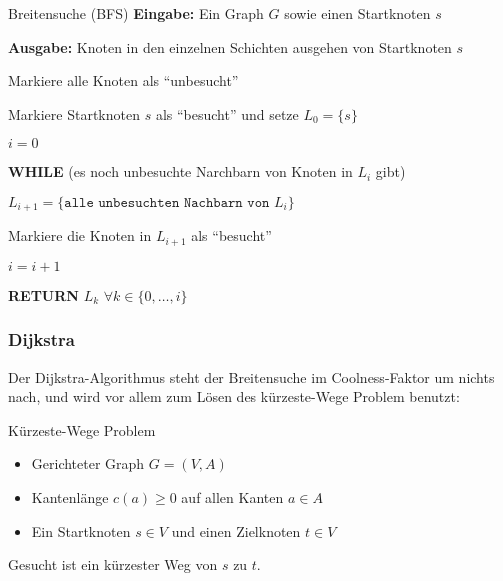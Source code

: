 \documentclass{panikzettel}
\newcommand\tab[1][1cm]{\hspace*{#1}}
\begin{document}
\begin{algo}{Breitensuche (BFS)}
	\textbf{Eingabe:} Ein Graph $G$ sowie einen Startknoten $s$
	
	\textbf{Ausgabe:} Knoten in den einzelnen Schichten ausgehen von Startknoten $s$
	
	\tcblower
	
	Markiere alle Knoten als ``unbesucht''
	
	Markiere Startknoten $s$ als ``besucht'' und setze $L_0 = \{s\}$
	
	$i=0$
	
	\textbf{WHILE} (es noch unbesuchte Narchbarn von Knoten in $L_i$ gibt)
	
	\tab $L_{i+1} = \{\texttt{alle unbesuchten Nachbarn von } L_i \}$
	
	\tab Markiere die Knoten in $L_{i+1}$ als ``besucht''
	
	\tab $i = i+1$
	
	\textbf{RETURN} $L_k$ $\forall k \in \{0, \dots, i\}$
\end{algo}

\subsubsection{Dijkstra}

Der Dijkstra-Algorithmus steht der Breitensuche im Coolness-Faktor um nichts nach, und wird vor allem zum Lösen des kürzeste-Wege Problem benutzt:

\begin{defi}{Kürzeste-Wege Problem}
	\begin{itemize}
		\item Gerichteter Graph $G= (V,A)$
		\item Kantenlänge $c(a)\geq 0$ auf allen Kanten $a \in A$
		\item Ein Startknoten $s \in V$ und einen Zielknoten $t \in V$
	\end{itemize}

	Gesucht ist ein kürzester Weg von $s$ zu $t$.
\end{defi}
\end{document}
